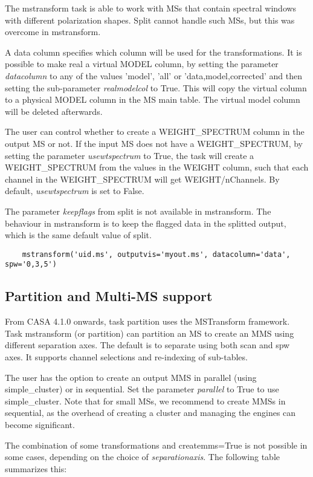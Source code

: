 The mstransform task is able to work with MSs that contain spectral windows with 
different polarization shapes. Split cannot handle such MSs, but this was overcome 
in mstransform.

A data column specifies which column will be used for the transformations. It is
possible to make real a virtual MODEL column, by setting the parameter
{\it datacolumn} to any of the values 'model', 'all' or 'data,model,corrected'
and then setting the sub-parameter {\it realmodelcol} to True. This will copy the virtual
column to a physical MODEL column in the MS main table. The virtual model column
will be deleted afterwards.

The user can control whether to create a WEIGHT_SPECTRUM column in the output MS or
not. If the input MS does not have a WEIGHT_SPECTRUM, by setting the parameter
{\it usewtspectrum} to True, the task will create a WEIGHT_SPECTRUM from the values
in the WEIGHT column, such that each channel in the WEIGHT_SPECTRUM will get WEIGHT/nChannels.
By default, {\it usewtspectrum} is set to False.

The parameter {\it keepflags} from split is not available in mstransform. The
behaviour in mstransform is to keep the flagged data  in the splitted output,
which is the same default value of split.

\begin{verbatim}
    mstransform('uid.ms', outputvis='myout.ms', datacolumn='data', spw='0,3,5')
\end{verbatim}

\subsection{Partition and Multi-MS support}
From CASA 4.1.0 onwards, task partition uses the MSTransform framework.
Task mstransform (or partition) can partition an MS to create an MMS using
different separation axes. The default is to separate using both scan and spw axes.
It supports channel selections and re-indexing of sub-tables. 

The user has the option to create an output MMS in parallel (using simple_cluster) or
in sequential. Set the parameter {\it parallel} to True to use simple_cluster. Note that
for small MSs, we recommend to create MMSs in sequential, as the overhead of creating
a cluster and managing the engines can become significant.

The combination of some transformations and createmms=True is not possible in
some cases, depending on the choice of {\it separationaxis}. The following table summarizes this:

